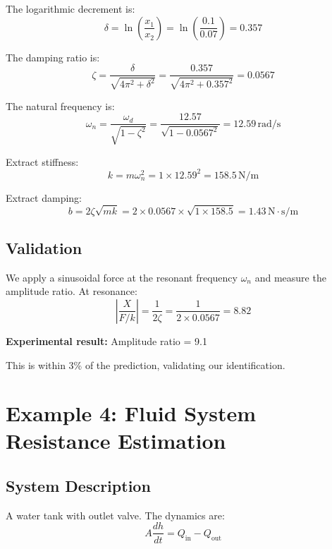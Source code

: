 The logarithmic decrement is:
\begin{equation}
\delta = \ln\left(\frac{x_1}{x_2}\right) = \ln\left(\frac{0.1}{0.07}\right) = 0.357
\end{equation}

The damping ratio is:
\begin{equation}
\zeta = \frac{\delta}{\sqrt{4\pi^2 + \delta^2}} = \frac{0.357}{\sqrt{4\pi^2 + 0.357^2}} = 0.0567
\end{equation}

The natural frequency is:
\begin{equation}
\omega_n = \frac{\omega_d}{\sqrt{1 - \zeta^2}} = \frac{12.57}{\sqrt{1 - 0.0567^2}} = 12.59 \, \text{rad/s}
\end{equation}

Extract stiffness:
\begin{equation}
k = m\omega_n^2 = 1 \times 12.59^2 = 158.5 \, \text{N/m}
\end{equation}

Extract damping:
\begin{equation}
b = 2\zeta\sqrt{mk} = 2 \times 0.0567 \times \sqrt{1 \times 158.5} = 1.43 \, \text{N}\cdot\text{s/m}
\end{equation}

\subsection{Validation}

We apply a sinusoidal force at the resonant frequency $\omega_n$ and measure the amplitude ratio. At resonance:
\begin{equation}
\left|\frac{X}{F/k}\right| = \frac{1}{2\zeta} = \frac{1}{2 \times 0.0567} = 8.82
\end{equation}

\textbf{Experimental result:} Amplitude ratio = 9.1

This is within 3\% of the prediction, validating our identification.

\section{Example 4: Fluid System Resistance Estimation}

\subsection{System Description}

A water tank with outlet valve. The dynamics are:
\begin{equation}
A\frac{dh}{dt} = Q_{\text{in}} - Q_{\text{out}}
\end{equation}

